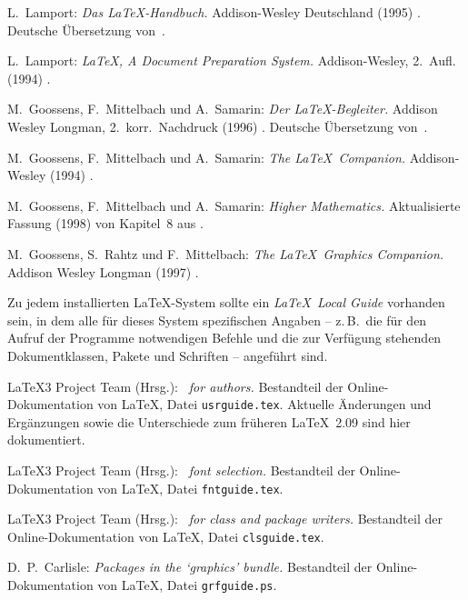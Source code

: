 \documentclass[11pt,a4paper]{article} %
\begin{document}
\begin{thebibliography}{99}  %
 
L.~Lamport: \textit{Das \LaTeX-Handbuch.}
Addison-Wesley Deutschland (1995)%
. Deutsche Übersetzung von~\cite{manual-eng}.

L.~Lamport: \textit{\LaTeX, A Document Preparation System.}
Ad\-di\-son-Wesley, 2.~Aufl. (1994)%
.
 
M.~Goossens, F.~Mittelbach und A.~Samarin:
\textit{Der \LaTeX-Begleiter.}
Ad\-di\-son Wesley Longman, 2.~korr.\ Nachdruck (1996)%
.  Deutsche Übersetzung von~\cite{wonne-eng}.

M.~Goossens, F.~Mittelbach und A.~Samarin:
\textit{The \LaTeX\ Companion.}
Ad\-di\-son-Wesley (1994)%
.  

M.~Goossens, F.~Mittelbach und A.~Samarin:
\textit{Higher Mathematics.} 
Aktualisierte Fassung (1998) von Kapitel\ 8 aus \cite{wonne-eng}.\\


M.~Goossens, S.~Rahtz und F.~Mittelbach:
\textit{The \LaTeX\ Graphics Companion.}
Addison Wesley Longman (1997)%
.

Zu jedem installierten \LaTeX-System sollte ein
\emph{\LaTeX\ Local Guide} vorhanden sein, in dem alle für
dieses System spezifischen Angaben -- z.\,B.~die für den
Aufruf der Programme notwendigen Befehle und die zur Verfügung
stehenden Dokumentklassen, Pakete und Schriften -- angeführt sind.
 
\LaTeX3 Project Team (Hrsg.): 
\textit{\LaTeXe\ for authors.} 
Bestandteil der Online-Dokumentation von \LaTeX,
Datei \texttt{usrguide.tex}.  
Aktuelle Änderungen und Ergänzungen sowie die Unterschiede zum früheren 
\LaTeX~2.09 sind hier dokumentiert.

\LaTeX3 Project Team (Hrsg.): 
\textit{\LaTeXe\ font selection.}
Bestandteil der Online-Dokumentation von \LaTeX,
Datei \texttt{fntguide.tex}.

\LaTeX3 Project Team (Hrsg.): 
\textit{\LaTeXe\ for class and package writers.}
Bestandteil der Online-Dokumentation von \LaTeX,
Datei \texttt{clsguide.tex}.

D.~P.~Carlisle: \textit{Packages in the `graphics' bundle.}
Bestandteil der Online-Dokumentation von \LaTeX,
Datei \texttt{grfguide.ps}.


\end{thebibliography}
\end{document}
